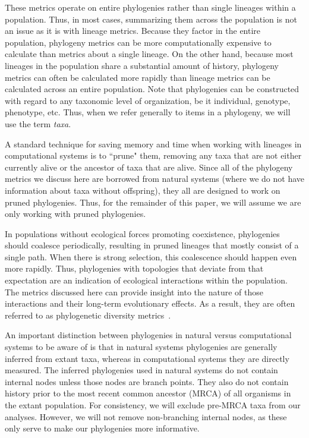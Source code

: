 \documentclass[letterpaper]{article}
\begin{document}
These metrics operate on entire phylogenies rather than single lineages within a population. Thus, in most cases, summarizing them across the population is not an issue as it is with lineage metrics. Because they factor in the entire population, phylogeny metrics can be more computationally expensive to calculate than metrics about a single lineage. On the other hand, because most lineages in the population share a substantial amount of history, phylogeny metrics can often be calculated more rapidly than lineage metrics can be calculated across an entire population. Note that phylogenies can be constructed with regard to any taxonomic level of organization, be it individual, genotype, phenotype, etc. Thus, when we refer generally to items in a phylogeny, we will use the term \textit{taxa}. %

A standard technique for saving memory and time when working with lineages in computational systems is to ``prune" them, removing any taxa that are not either currently alive or the ancestor of taxa that are alive. Since all of the phylogeny metrics we discuss here are borrowed from natural systems (where we do not have information about taxa without offspring), they all are designed to work on pruned phylogenies. Thus, for the remainder of this paper, we will assume we are only working with pruned phylogenies.

In populations without ecological forces promoting coexistence, phylogenies should coalesce periodically, resulting in pruned lineages that mostly consist of a single path. When there is strong selection, this coalescence should happen even more rapidly. Thus, phylogenies with topologies that deviate from that expectation are an indication of ecological interactions within the population. The metrics discussed here can provide insight into the nature of those interactions and their long-term evolutionary effects. As a result, they are often referred to as phylogenetic diversity metrics~\citep{tucker_guide_2017}.

An important distinction between phylogenies in natural versus computational systems to be aware of is that in natural systems phylogenies are generally inferred from extant taxa, whereas in computational systems they are directly measured. The inferred phylogenies used in natural systems do not contain internal nodes unless those nodes are branch points. They also do not contain history prior to the most recent common ancestor (MRCA) of all organisms in the extant population. For consistency, we will exclude pre-MRCA taxa from our analyses. However, we will not remove non-branching internal nodes, as these only serve to make our phylogenies more informative.
\end{document}
